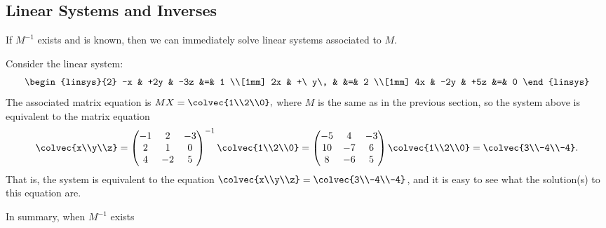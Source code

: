 \subsection{Linear Systems and Inverses}

If $M^{-1}$ exists and is known, then we can immediately solve linear systems associated to $M$.

\begin{example}
Consider the linear system:
\[
      \begin{linsys}{2}
            -x & +2y & -3z         &=& 1  \\[1mm]
            2x & +\ y\,   &             &=& 2 \\[1mm]
            4x & -2y & +5z         &=& 0  
      \end{linsys}
\]
The associated matrix equation is $MX=\colvec{1\\2\\0},$ where \(M\) is the same as in the previous section, so the system above is equivalent to the matrix equation
\[
\colvec{x\\y\\z}=\begin{pmatrix}
-1 & 2 & -3 \\
2 & 1 & 0 \\
4 & -2 & 5 \\
\end{pmatrix}^{-1}\colvec{1\\2\\0}
=\begin{pmatrix}
-5 & 4 & -3 \\
10 & -7 & 6 \\
 8 & -6 & 5 \\
\end{pmatrix}\colvec{1\\2\\0}
=\colvec{3\\-4\\-4}.
\]
That is, the system is equivalent to the equation $\colvec{x\\y\\z}=\colvec{3\\-4\\-4}$, and it is easy to see what the solution(s) to this equation are. 
\end{example}
In summary, when $M^{-1}$ exists 

\begin{center}
\end{center}


